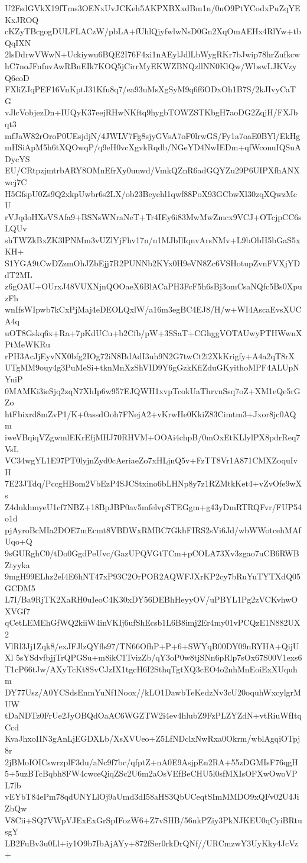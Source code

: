 U2FsdGVkX19fTms3OENxUvJCKeh5AKPXBXxdBm1n/0uO9PtYCodxPuZqYEKxJROQ
cKZyTBcgogDULFLACzW/pbLA+fUhlQjyfwlwNsD0Gn2XqOmAEHx4RlYw+tbQqIXN
2lsDdrwVWwN+Uckiywu6BQE2I76F4xi1nAEylJdlLbWygRKr7bJwip78hrZufkcw
hC7noJFnfnvAwRBnEIk7KOQ5jCirrMyEKWZBNQzllNN0KlQw/WbswLJKVzyQ6eoD
FXliZJqPEF16VnKptJ31Kfu8q7/ea93uMsXgSyM9q6f6ODxOh1B7S/2kJIvyCaTG
vJlcVobjezDn+IUQyK37eejRHwNKftq9hygbTOWZSTKbgH7aoDG2ZqjH/FXJbqt3
mfJaW82rOroP0UEsjdjN/4JWLV7Fg8sjyGVsA7oF0lrwGS/Fy1a7oaE0BYl/EkHg
mHSiApM5h6tXQOwqP/q9eH0vcXgvkRqdb/NGeYD4NwIEDm+qfWconuIQSuADycYS
EU/CRtpzjmtrbARY8OMnEfrXy0uuwd/VmkQZnR6adGQYZu29P6UIPXfhANXwcj7C
H5GfspU0Zs9Q2xkpUwbr6s2LX/ob23Beyehl1qwf88PoX93GCbwXl30zqXQwzMcU
rVJqdoHXsVSAfa9+BSNsWNraNeT+Tr4IEy6i83MwMwZmcx9VCJ+OTcjpCC6sLQUv
shTWZkBxZK3lPNMm3vUZlYjFhv17n/n1MJbIlIqnvArsNMv+L9bObH5bGaS5xKH+
S1YGA9tCwDZzmOhJZbEjj7R2PUNNb2KYx0H9eVN8Zc6VSHotupZvnFVXjYDdT2ML
z6gOAU+OUrxJ48VUXNjnQOOaeX6BlACaPH3FcF5h6sBj3omCsaNQfc5Bs0XpuzFh
wnIfsWIpwb7kCxPjMaj4eDEOLQxlW/a16m3egBC4EJ8/H/w+WI4AscaEvsXUCA4q
uOT8Gskq6x+Ra+7pKdUCu+b2Cfb/pW+3SSaT+CGhggVOTAUwyPTHWwnXPtMeWKRu
rPH3AcJjEyvNX0bfg2IOg72iN8BdAdI3uh9N2G7twCt2i2XkKrigfy+A4a2qT8rX
UTgMM9ouy4g3PuMeSi+tknMnXzShVID9Y6gGzkKfiZduGKyithoMPF4ALUpNYniP
0MAMKi3ieSjq2zqN7XhIp6w957EJQWH1xvpTcokUaThrvnSsq7oZ+XM1eQe5rGZo
htFbixrd8mZvP1/K+0assdOoh7FNejA2+vKrwHe0KkiZ83Cimtm3+Jxor8jc0AQm
iweVBqiqVZgwmlEKrEfjMHJ70RHVM+OOAi4chpB/0mOxEtKLlylPX8pdrReq7VsL
VC34wgYL1E97PT0lyjnZyd0cAeriaeZo7xHLjnQ5v+FzTT8Vr1A871CMXZoquIvH
7E23JTdq/PccgHBom2VbEzP4SJCStxino6bLHNp8y7z1RZMtkKet4+vZvOfe9wXs
Z4dnkhmyeU1cf7NBZ+18BpJBP0av5mfelvpSTEGgm+g43yDmRTRQFvr/FUP54o1d
pjAyroBcMIa2DOE7mEcmt8VBDWxRMBC7GkhFIRS2sVi6Jd/wbWWotcehMAfUqo+Q
9sGURghC0/tDo0GgdPeUvc/GazUPQVGtTCm+pCOLA73Xv3zgao7uCB6RWBZtyyka
9mgH99ELhz2eI4E6hNT47xP93C2OrPOR2AQWFJXrKP2cy7bRuYuTYTXdQ05GCDM5
L7I/Ba9RjTK2XaRH0uIeoC4K30xDY56DEBhHeyyOV/uPBYL1Pg2zVCKvhwOXVGf7
qCetLEMEhGfWQ2kiiW4inVKIj6ufShEcsb1L6B8imj2Er4my01vPCQzE1N882UX2
VlRl3Jj1Zqk8/exJFJlzQYfls97/TN66OfhP+P+6+SWYqB00DY09nRYHA+QijUXl
5sYSdvfbjjTrQPGSu+m8ikC1TvizZb/qY3oP0w8tjSNn6pRlp7sOx67S00V1exs6
T1cP66tJw/AXyTcKt8SvCJzIX1tgcH6I2SthqTgtXQ3cEO4o2nhMnEoiExXUquhm
DY77Usz/A0YCSdsEnmYuNf1Noox//kLO1DawbTeKedzNv3cU20oquhWxcylgrMUW
tDaNDTz0FrUe2JyOBQdOaAC6WGZTW2i4ev4hlubZ9FzPLZYZdN+vtRiuWfItqCcd
KvaJhxoIIN3gAnLjEGDXLb/XsXVUeo+Z5LfNDclxNwRxa0Okrm/wblAgqiOTpj8r
2jBMoIOICswrzplF3du/aNc9f7bc/qfptZ+nA0E9AsjpEn2RA+55zDGMIsF76qgH
5+5uzBTcBqbh8FW4cwceQiqZSc2U6m2aOsVEfBeCHU5l0sfMXIsOFXwOwoVPL7lb
vEYbT84ePm78qdUNYLlOj9aUmd3dI58aHS3QbUCeqtSImMMDO9xQFv02U4JiZbQw
V8Cii+SQ7VWpVJExExGrSpIFozW6+Z7vSHB/56nkPZiy3PkNJKEU0qCyiBRtusgY
LB2FuBv3u0Ll+iy1O9b7IbAjAYy+872fSer0rkDrQNf//URCmzwY3UyKky4JcVz+
